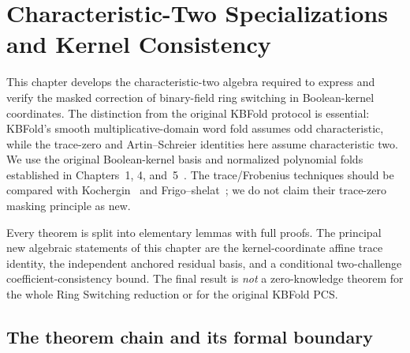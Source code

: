 \section{Characteristic-Two Specializations and Kernel Consistency}\label{sec:binary}

This chapter develops the characteristic-two algebra required to
express and verify the masked correction of binary-field ring
switching in Boolean-kernel coordinates. The distinction from the
original KBFold protocol is essential: KBFold's smooth
multiplicative-domain word fold assumes odd characteristic, while
the trace-zero and Artin--Schreier identities here assume
characteristic two. We use the original Boolean-kernel basis
and normalized polynomial folds established in
Chapters~1, 4, and~5~\cite{MkhidaKBFold2026}.
The trace/Frobenius techniques should be compared with
Kochergin~\cite{Kochergin2026} and
Frigo--shelat~\cite{FrigoShelat2026};
we do not claim their trace-zero masking principle as new.

Every theorem is split into elementary lemmas with full proofs.
The principal new algebraic statements of this chapter are the
kernel-coordinate affine trace identity,
the independent anchored residual basis,
and a conditional two-challenge coefficient-consistency bound.
The final result is \emph{not} a zero-knowledge theorem for
the whole Ring Switching reduction or for the original KBFold PCS.










\subsection{The theorem chain and its formal boundary}\label{sec:binary:conclusion}

